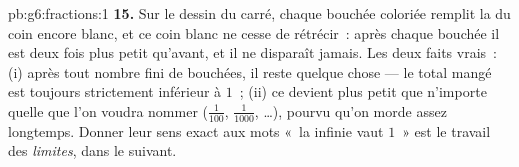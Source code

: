\begin{solution}{pb:g6:fractions:1}
\textbf{15.} Sur le dessin du carré, chaque bouchée coloriée remplit
la  du coin encore blanc, et ce coin blanc ne cesse de
rétrécir~: après chaque bouchée il est deux fois plus petit
qu'avant, et il ne disparaît jamais. Les deux faits vrais~: (i)
après tout nombre fini de bouchées, il reste quelque chose --- le
total mangé est toujours strictement inférieur à $1$~; (ii) ce 
devient plus petit que n'importe quelle  que l'on voudra
nommer ($\frac{1}{100}$, $\frac{1}{1000}$, \dots), pourvu qu'on morde
assez longtemps. Donner leur sens exact aux mots «~la  infinie
vaut $1$~» est le travail des \emph{limites}, dans le  suivant.
\end{solution}
